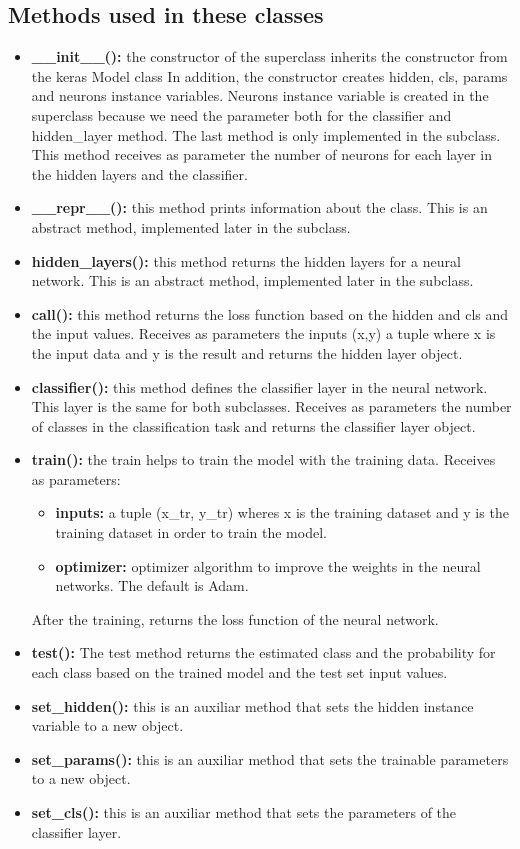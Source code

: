 \documentclass[11pt]{article}
\begin{document}
\subsection{Methods used in these classes}
\begin{itemize}
\item \textbf{\_\_init\_\_():} the constructor of the superclass inherits the constructor from the keras Model class In addition, the constructor creates hidden, cls, params and neurons instance variables. Neurons instance variable is created in the superclass because we need the parameter both for the classifier and hidden\_layer method. The last method is only implemented in the subclass. This method receives as parameter the number of neurons for each layer in the hidden layers and the classifier.
\item \textbf{\_\_repr\_\_():} this method prints information about the class. This is an abstract method, implemented later in the subclass.
\item \textbf{hidden\_layers():} this method returns the hidden layers for a neural network. This is an abstract method, implemented later in the subclass.
\item \textbf{call():} this method returns the loss function based on the hidden and cls and the input values. Receives as parameters the inputs (x,y) a tuple where x is the input data and y is the result and returns the hidden layer object.
\item \textbf{classifier():} this method defines the classifier layer in the neural network. This layer is the same for both subclasses. Receives as parameters the number of classes in the classification task and returns the classifier layer object.
\item \textbf{train():} the train helps to train the model with the training data. Receives as parameters:
\begin{itemize}
            \item \textbf{inputs:} a tuple (x\_tr, y\_tr) wheres x is the training dataset and y is the training dataset in order to train the model.
            \item \textbf{optimizer:} optimizer algorithm to improve the weights in the neural networks. The default is Adam.
\end{itemize}
After the training, returns the loss function of the neural network.
\item \textbf{test():} The test method returns the estimated class and the probability for each class based on the trained model and the test set input values.
\item \textbf{set\_hidden():} this is an auxiliar method that sets the hidden instance variable to a new object.
\item \textbf{set\_params():} this is an auxiliar method that sets the trainable parameters to a new object.
\item \textbf{set\_cls():} this is an auxiliar method that sets the parameters of the classifier layer.
\end{itemize}
\end{document}
